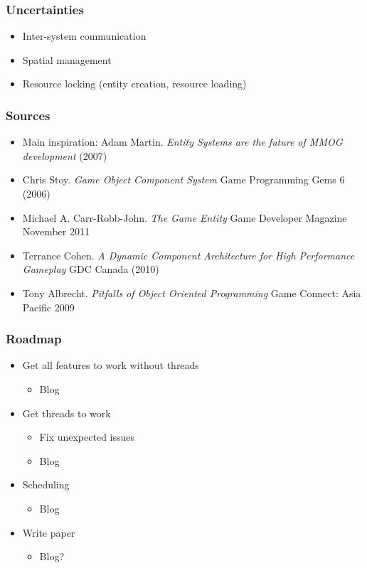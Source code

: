 \documentclass[ignorenonframetext,]{beamer}
\begin{document}
\begin{frame}\frametitle{Uncertainties}

\begin{itemize}
\item
  Inter-system communication
\item
  Spatial management
\item
  Resource locking (entity creation, resource loading)
\end{itemize}

\end{frame}

\begin{frame}\frametitle{Sources}

\begin{itemize}
\item
  Main inspiration: Adam Martin. \emph{Entity Systems are the future of
  MMOG development}
  (2007)
\item
  Chris Stoy. \emph{Game Object Component System} Game Programming Gems
  6 (2006)
\item
  Michael A. Carr-Robb-John. \emph{The Game Entity} Game Developer
  Magazine November 2011
\item
  Terrance Cohen. \emph{A Dynamic Component Architecture for High
  Performance Gameplay} GDC Canada (2010)
\item
  Tony Albrecht. \emph{Pitfalls of Object Oriented Programming} Game
  Connect: Asia Pacific 2009
\end{itemize}

\end{frame}

\begin{frame}\frametitle{Roadmap}

\begin{itemize}
\item
  Get all features to work without threads

  \begin{itemize}
  \item
    Blog
  \end{itemize}
\item
  Get threads to work

  \begin{itemize}
  \item
    Fix unexpected issues
  \item
    Blog
  \end{itemize}
\item
  Scheduling

  \begin{itemize}
  \item
    Blog
  \end{itemize}
\item
  Write paper

  \begin{itemize}
  \item
    Blog?
  \end{itemize}
\end{itemize}

\end{frame}
\end{document}
